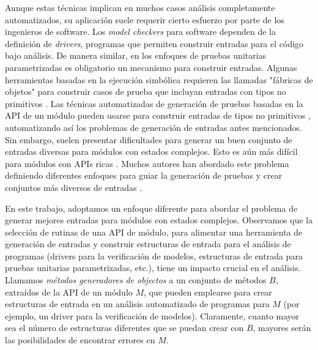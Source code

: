 Aunque estas técnicas implican en muchos casos análisis completamente automatizados, su aplicación suele requerir cierto esfuerzo por parte de los ingenieros de software. Los \emph{model checkers} para software dependen de la definición de \emph{drivers}, programas que permiten construir entradas para el código bajo análisis. De manera similar, en los enfoques de pruebas unitarias parametrizadas \cite{Tillmann:2010} es obligatorio un mecanismo para construir entradas. Algunas herramientas basadas en la ejecución simbólica requieren las llamadas "fábricas de objetos" para construir casos de prueba que incluyan entradas con tipos no primitivos \cite{Tillmann:2008}. Las técnicas automatizadas de generación de pruebas basadas en la API de un módulo pueden usarse para construir entradas de tipos no primitivos \cite{Pacheco07, Fraser11}, automatizando así los problemas de generación de entradas antes mencionados. Sin embargo, suelen presentar dificultades para generar un buen conjunto de entradas diversas para módulos con estados complejos. Esto es aún más difícil para módulos con APIs ricas \cite{Ponzio:2018}. Muchos autores han abordado este problema definiendo diferentes enfoques para guiar la generación de pruebas y crear conjuntos más diversos de entradas \cite{Ponzio:2018, Ciupa:2008}.

En este trabajo, adoptamos un enfoque diferente para abordar el problema de generar mejores entradas para módulos con estados complejos. Observamos que la selección de rutinas de una API de módulo, para alimentar una herramienta de generación de entradas y construir estructuras de entrada para el análisis de programas (drivers para la verificación de modelos, estructuras de entrada para pruebas unitarias parametrizadas, etc.), tiene un impacto crucial en el análisis. Llamamos \emph{métodos generadores de objectos} a un conjunto de métodos \(B\), extraídos de la API de un módulo \(M\), que pueden emplearse para crear estructuras de entrada en un análisis automatizado de programas para \(M\) (por ejemplo, un driver para la verificación de modelos). Claramente, cuanto mayor sea el número de estructuras diferentes que se puedan crear con \(B\), mayores serán las posibilidades de encontrar errores en \(M\).

